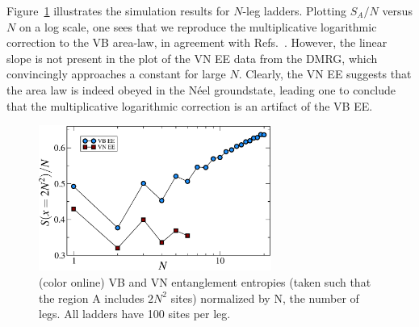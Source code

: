 \documentclass[prl,aps,twocolumn,floatfix,amsmath,amssymb,superscriptaddress,tightenlines]{revtex4}
\begin{document}
Figure~\ref{zigzag} illustrates the simulation results for $N$-leg ladders.
Plotting $S_A/N$ versus $N$ on a log scale, one sees that we reproduce the
multiplicative logarithmic correction to the VB area-law, in agreement
with Refs.~\cite{Alet,Chh}.  However, the linear slope is not present in
the plot of the VN EE data from the DMRG, which convincingly approaches a
constant for large $N$.  Clearly, the VN EE suggests that the area law is
indeed obeyed in the N\'eel groundstate, leading one to conclude that the
multiplicative logarithmic correction is an artifact of the VB EE.


\begin{figure} { \includegraphics[width=3in]{fig4.eps} \caption{(color
online) VB and VN entanglement entropies (taken such that the region A
includes $2N^2$ sites) normalized by N, the number of legs.  All ladders
have 100 sites per leg.  \label{zigzag}}} \end{figure}
\end{document}
